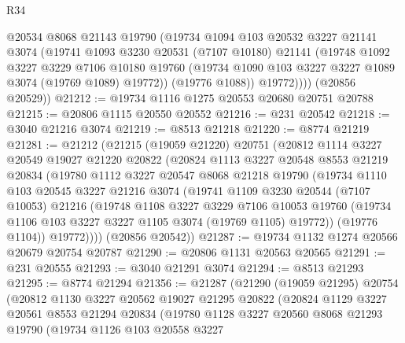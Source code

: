 \begin{lexlean}{R34}
\begin{coremodule}
            @20534
            @8068
            @21143
            @19790
            (@19734
              @1094
              @103
              @20532
              @3227
              @21141
              @3074
              (@19741
                @1093
                @3230
                @20531
                (@7107 @10180)
                @21141
                (@19748
                  @1092
                  @3227
                  @3229
                  @7106
                  @10180
                  @19760
                  (@19734 @1090 @103 @3227 @3227 @1089 @3074 (@19769 @1089) @19772))
                (@19776 @1088))
              @19772))))
      (@20856 @20529))
@21212 := @19734 @1116 @1275 @20553 @20680 @20751 @20788
@21215 := @20806 @1115 @20550 @20552
@21216 := @231 @20542
@21218 := @3040 @21216 @3074
@21219 := @8513 @21218
@21220 := @8774 @21219
@21281 := @21212
    (@21215
      (@19059 @21220)
      @20751
      (@20812
        @1114
        @3227
        @20549
        @19027
        @21220
        @20822
        (@20824
          @1113
          @3227
          @20548
          @8553
          @21219
          @20834
          (@19780
            @1112
            @3227
            @20547
            @8068
            @21218
            @19790
            (@19734
              @1110
              @103
              @20545
              @3227
              @21216
              @3074
              (@19741
                @1109
                @3230
                @20544
                (@7107 @10053)
                @21216
                (@19748
                  @1108
                  @3227
                  @3229
                  @7106
                  @10053
                  @19760
                  (@19734 @1106 @103 @3227 @3227 @1105 @3074 (@19769 @1105) @19772))
                (@19776 @1104))
              @19772))))
      (@20856 @20542))
@21287 := @19734 @1132 @1274 @20566 @20679 @20754 @20787
@21290 := @20806 @1131 @20563 @20565
@21291 := @231 @20555
@21293 := @3040 @21291 @3074
@21294 := @8513 @21293
@21295 := @8774 @21294
@21356 := @21287
    (@21290
      (@19059 @21295)
      @20754
      (@20812
        @1130
        @3227
        @20562
        @19027
        @21295
        @20822
        (@20824
          @1129
          @3227
          @20561
          @8553
          @21294
          @20834
          (@19780
            @1128
            @3227
            @20560
            @8068
            @21293
            @19790
            (@19734
              @1126
              @103
              @20558
              @3227

\end{coremodule}
\end{lexlean}

